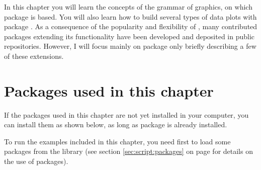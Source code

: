 \documentclass[krantz2]{krantz}\usepackage{knitr}
\begin{document}
In this chapter you will learn the concepts of the grammar of graphics, on which package  is based. You will also learn how to build several types of data plots with package . As a consequence of the popularity and flexibility of , many contributed packages extending its functionality have been developed and deposited in public repositories. However, I will focus mainly on package  only briefly describing a few of these extensions.

\section{Packages used in this chapter}



If the packages used in this chapter are not yet installed in your computer, you can install them as shown below, as long as package  is already installed.

\begin{knitrout}\footnotesize
{}\color{fgcolor}\begin{kframe}
\begin{alltt}
\hlopt{::}
\end{alltt}
\end{kframe}
\end{knitrout}

To run the examples included in this chapter, you need first to load some packages from the library (see section \ref{sec:script:packages} on page \pageref{sec:script:packages} for details on the use of packages).

\begin{knitrout}\footnotesize
{}\color{fgcolor}\begin{kframe}
\begin{alltt}
\end{alltt}
\end{kframe}
\end{knitrout}
\end{document}
